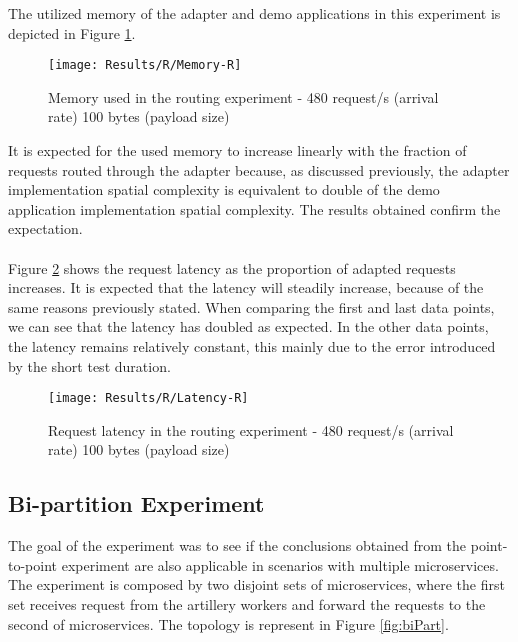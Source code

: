 The utilized memory of the adapter and demo applications in this experiment is depicted in Figure \ref{fig:routMem}.

\begin{figure}[htbp]
    \centering
    \texttt{[image: Results/R/Memory-R]}
    \caption{Memory used in the routing experiment - 480 request/s (arrival rate) 100 bytes (payload size)}
    \label{fig:routMem}
\end{figure}

It is expected for the used memory to increase linearly with the fraction of requests routed through the adapter because, as discussed previously,
the adapter implementation spatial complexity is equivalent to double of the demo application implementation spatial complexity.
The results obtained confirm the expectation.

\paragraph{}

Figure \ref{fig:routLatency} shows the request latency as the proportion of adapted requests increases.
It is expected that the latency will steadily increase, because of the same reasons previously stated.
When comparing the first and last data points, we can see that the latency has doubled as expected.
In the other data points, the latency remains relatively constant, this mainly due to the error introduced by the short test duration.

\begin{figure}[htbp]
    \centering
    \texttt{[image: Results/R/Latency-R]}
    \caption{Request latency in the routing experiment - 480 request/s (arrival rate) 100 bytes (payload size)}
    \label{fig:routLatency}
\end{figure}

\subsection{Bi-partition Experiment}

The goal of the experiment was to see if the conclusions obtained from the point-to-point experiment are also applicable in scenarios with multiple microservices.
The experiment is composed by two disjoint sets of microservices, where the first set receives request from the artillery workers and forward the requests to the second of microservices.
The topology is represent in Figure \ref{fig:biPart}.

